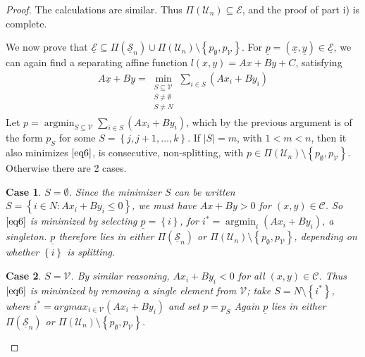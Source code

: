 \documentclass{article}
\theoremstyle{case}
\newtheorem{case}{Case}
\DeclareMathOperator*{\argmin}{argmin} %
\begin{document}
\begin{proof}
The calculations are similar. Thus $\Pi \left( \mathcal{U}_n\right) \subseteq \mathcal{E}$, and the proof of part i) is complete.

We now prove that $\underline{\mathcal{E}} \subseteq \Pi\left( \underline{\mathcal{S}}_n\right) \cup \Pi\left( \mathcal{U}_n\right) \setminus \left\lbrace p_{\emptyset}, p_{\mathcal{V}}\right\rbrace$. For $\underline{p} = \left( \underline{x}, \underline{y} \right) \in \underline{\mathcal{E}}$, we can again find a separating affine function $l\left( x,y\right) = Ax + By + C$, satisfying
\begin{align} \label{eq6}
A\underline{x} + B\underline{y} =\min_{\substack{S \subseteq \mathcal{V} \\ S \neq \emptyset \\ S \neq N}} \sum_{i \in S} \left( Ax_i + By_i\right)
\end{align}
Let $p = \argmin_{S \subseteq \mathcal{V}} \sum_{i \in S} \left( Ax_i + By_i\right)$, which by the previous argument is of the form $p_S$ for some $S = \left\lbrace j, j+1, \dots, k\right\rbrace$. If $\vert S \vert = m$, with $1 < m < n$, then it also minimizes $\ref{eq6}$, is consecutive, non-splitting, with $p \in \Pi\left( \mathcal{U}_n\right) \setminus \left\lbrace p_{\emptyset}, p_{\mathcal{V}}\right\rbrace$. Otherwise there are 2 cases.

\setcounter{case}{0}
\begin{case} $S = \emptyset$. 
Since the minimizer $S$ can be written $S = \left\lbrace i \in N \colon Ax_i + By_i \leq 0 \right\rbrace$, we must have $Ax + By > 0$ for $\left( x,y\right) \in \mathcal{C}$. So $\ref{eq6}$ is minimized by selecting $\underline{p} = \left\lbrace i\right\rbrace$, for $i^* = \argmin_i \left( Ax_i + By_i\right)$, a singleton. $\underline{p}$ therefore lies in either $\Pi\left( \underline{\mathcal{S}}_n\right)$ or $\Pi\left( \mathcal{U}_n\right) \setminus{\left\lbrace p_\emptyset, p_{\mathcal{V}}\right\rbrace }$, depending on whether $\left\lbrace i\right\rbrace$ is splitting.
\end{case}

\begin{case} $S = \mathcal{V}$. By similar reasoning, $Ax_i + By_i < 0$ for all $\left( x,y\right) \in \mathcal{C}$. Thus $\ref{eq6}$ is minimized by removing a single element from $\mathcal{V}$; take $S = N\setminus \left\lbrace i^*\right\rbrace$, where $i^* = argmax_{i \in \mathcal{V}} \left( Ax_i + By_i\right)$ and set $p = p_S$ Again $\underline{p}$ lies in either $\Pi\left( \underline{\mathcal{S}}_n\right)$ or $\Pi\left( \mathcal{U}_n\right) \setminus{\left\lbrace p_\emptyset, p_{\mathcal{V}}\right\rbrace }$.
\end{case}


\end{proof}
\end{document}
